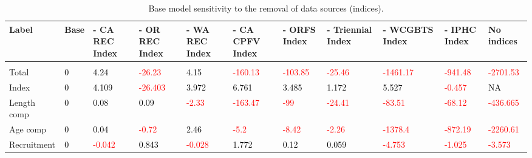 \documentclass[
]{scrartcl}
\begin{document}
\begin{landscape}
\begingroup\fontsize{9}{11}\selectfont

\begin{longtable}[t]{ll>{\raggedright\arraybackslash}p{4em}>{\raggedright\arraybackslash}p{4em}>{\raggedright\arraybackslash}p{4em}>{\raggedright\arraybackslash}p{4em}>{\raggedright\arraybackslash}p{4em}>{\raggedright\arraybackslash}p{4em}>{\raggedright\arraybackslash}p{4em}>{\raggedright\arraybackslash}p{4em}>{\raggedright\arraybackslash}p{4em}}

\caption{\label{tbl-sensitivities-like-indices}Base model sensitivity to
the removal of data sources (indices).}

\tabularnewline

\toprule
Label & Base & - CA REC Index & - OR REC Index & - WA REC Index & - CA CPFV Index & - ORFS Index & - Triennial Index & - WCGBTS Index & - IPHC Index & No indices\\
\midrule
\addlinespace[0.3em]
\multicolumn{11}{l}{\textbf{Diff. in likelihood from base model}}\\
\hspace{1em}Total & \textcolor{black}{0} & \textcolor{black}{4.24} & \textcolor{red}{-26.23} & \textcolor{black}{4.15} & \textcolor{red}{-160.13} & \textcolor{red}{-103.85} & \textcolor{red}{-25.46} & \textcolor{red}{-1461.17} & \textcolor{red}{-941.48} & \textcolor{red}{-2701.53}\\
\hspace{1em}Index & \textcolor{black}{0} & \textcolor{black}{4.109} & \textcolor{red}{-26.403} & \textcolor{black}{3.972} & \textcolor{black}{6.761} & \textcolor{black}{3.485} & \textcolor{black}{1.172} & \textcolor{black}{5.527} & \textcolor{red}{-0.457} & \textcolor{black}{NA}\\
\hspace{1em}Length comp & \textcolor{black}{0} & \textcolor{black}{0.08} & \textcolor{black}{0.09} & \textcolor{red}{-2.33} & \textcolor{red}{-163.47} & \textcolor{red}{-99} & \textcolor{red}{-24.41} & \textcolor{red}{-83.51} & \textcolor{red}{-68.12} & \textcolor{red}{-436.665}\\
\hspace{1em}Age comp & \textcolor{black}{0} & \textcolor{black}{0.04} & \textcolor{red}{-0.72} & \textcolor{black}{2.46} & \textcolor{red}{-5.2} & \textcolor{red}{-8.42} & \textcolor{red}{-2.26} & \textcolor{red}{-1378.4} & \textcolor{red}{-872.19} & \textcolor{red}{-2260.61}\\
\hspace{1em}Recruitment & \textcolor{black}{0} & \textcolor{red}{-0.042} & \textcolor{black}{0.843} & \textcolor{red}{-0.028} & \textcolor{black}{1.772} & \textcolor{black}{0.12} & \textcolor{black}{0.059} & \textcolor{red}{-4.753} & \textcolor{red}{-1.025} & \textcolor{red}{-3.573}\\

\end{longtable}
\end{landscape}
\end{document}
